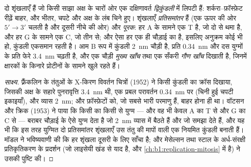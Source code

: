 \begin{theorem}[वॉटसन--क्रिक द्विकुंडली]\label{thm:b1:nucleic-acids:helix}
 दो  शृंखलाएँ हैं जो किसी साझा अक्ष के चारों ओर एक
दक्षिणावर्त \emph{द्विकुंडली} में लिपटी हैं: शर्करा--फ़ॉस्फ़ेट रीढ़ें
बाहर, और  भीतर, चपटे और अक्ष के लंब चिने हुए।
शृंखलाएँ \emph{प्रतिसमांतर} हैं (एक ऊपर की ओर $5' \to 3'$ चलती है और
दूसरी नीचे की ओर) और \emph{पूरक}: हर A के सामने एक T है, जो दो  से थमा है, और हर G के सामने एक C, जो तीन से; और ऐसा हर
\emph{} एक ही चौड़ाई का है, इसलिए अनुक्रम कोई भी हो, कुंडली
एकसमान रहती है। आम B रूप में कुंडली \qty{2}{nm} चौड़ी है, प्रति  \qty{0.34}{nm} और दस युग्मों के प्रति फेरे \qty{3.4}{nm} चढ़ती है,
और एक चौड़ी \emph{मुख्य खाँच} तथा एक सँकरी \emph{गौण खाँच} दिखाती है,
जिनमें क्षारकों के किनारे प्रोटीनों के सामने खुले रहते हैं।
\end{theorem}
\begin{proof}[साक्ष्य]
फ़्रैंकलिन के  तंतुओं के X-किरण विवर्तन चित्रों (1952) ने किसी कुंडली
का क्रॉस दिखाया, जिसकी अक्ष के सहारे पुनरावृत्ति \qty{3.4}{nm} थी, एक
प्रबल परावर्तन \qty{0.34}{nm} पर (चिनी हुई चपटी इकाइयाँ), और व्यास
\qty{2}{nm}; और फ़ॉस्फ़ेटों को, जो सबसे भारी परमाणु हैं, बाहर होना ही
था। वॉटसन और क्रिक (1953) ने पाया कि किसी  का किसी
 से युग्म --- और वह भी केवल A का T से और G का C से --- बराबर
चौड़ाई के ऐसे युग्म देता है जो \qty{2}{nm} व्यास में बैठते हैं और जो
 समझा देते हैं, और यह भी कि इस तरह युग्मित दो प्रतिसमांतर
शृंखलाएँ उस तंतु की मापों वाली एक नियमित कुंडली बनाती हैं। मॉडल ने
भविष्यवाणी की कि हर शृंखला दूसरी के लिए साँचा है; और मेसेल्सन तथा स्टाल
के अर्ध-संरक्षी प्रतिकृतिकरण के प्रदर्शन (जो लाइसेयी खंड से याद है,
और \cref{ch:b1:replication-mitosis} में है) ने उसकी पुष्टि की।
\end{proof}

